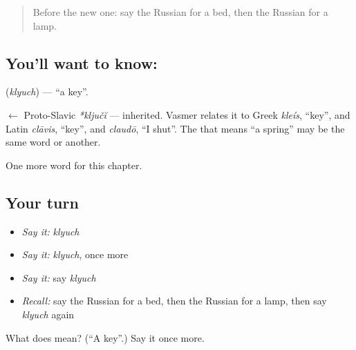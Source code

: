 \label{lesson:RU-C49-key}



\begin{quote}
Before the new one: say the Russian for a bed, then the Russian for a lamp.
\end{quote}

\subsection*{You'll want to know: }
\textbf{} (\emph{klyuch}) — \textquotedblleft{}a key\textquotedblright{}.

\begin{cousinweb}
\textbf{} $\leftarrow$ Proto-Slavic \emph{*ključĭ} — inherited. Vasmer relates it to Greek \emph{kleís}, \textquotedblleft{}key\textquotedblright{}, and Latin \emph{clāvis}, \textquotedblleft{}key\textquotedblright{}, and \emph{claudō}, \textquotedblleft{}I shut\textquotedblright{}. The \emph{} that means \textquotedblleft{}a spring\textquotedblright{} may be the same word or another.
\end{cousinweb}

\begin{grammarlens}[title={What you've built}]
One more word for this chapter.
\end{grammarlens}

\subsection*{Your turn}
\begin{itemize}
\raggedright
  \item \emph{Say it:} \emph{klyuch}
  \item \emph{Say it:} \emph{klyuch}, once more
  \item \emph{Say it:} say \emph{klyuch}
  \item \emph{Recall:} say the Russian for a bed, then the Russian for a lamp, then say \emph{klyuch} again
\end{itemize}

\begin{tcolorbox}[breakable,colback=teal!4,colframe=teal!35!black,title={Before you move on}]
What does  mean? (\textquotedblleft{}A key\textquotedblright{}.) Say it once more.
\end{tcolorbox}
